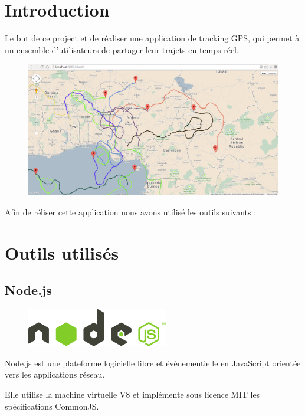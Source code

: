 \documentclass[a4paper]{article}
\begin{document}
\section{Introduction}
Le but de ce project et de réaliser une application de tracking GPS, qui 
permet à un ensemble d'utilisateurs de partager leur trajets en temps réel.

\begin{figure}[H]
  \begin{center}
  \includegraphics[scale=0.25]{screenshot.png}
  \end{center}
\end{figure}

Afin de réliser cette application nous avons utilisé les outils suivants :

\section{Outils utilisés}
\subsection{Node.js}

\begin{figure}[H]
  \begin{center}
  \includegraphics[scale=0.5]{nodejs.png}
  \end{center}
\end{figure}

Node.js est une plateforme logicielle libre et événementielle en 
JavaScript orientée vers les applications réseau.

Elle utilise la machine virtuelle V8 et implémente sous 
licence MIT les spécifications CommonJS. 
\end{document}
